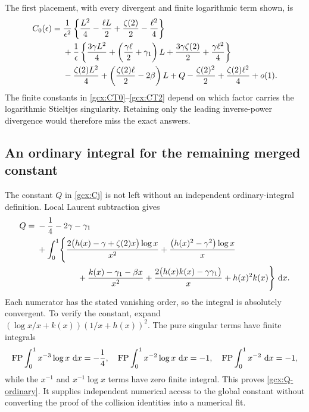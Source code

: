 The first placement, with every divergent and finite logarithmic term
shown, is
\begin{align}
 C_0(\epsilon)={}&\frac1{\epsilon^2}
  \left\{\frac{L^2}{4}-\frac{\ell L}{2}
                  +\frac{\zeta(2)}2-\frac{\ell^2}{4}\right\}\notag\\
 &+\frac1\epsilon\left\{
       \frac{3\gamma L^2}{4}
       +\left(\frac{\gamma\ell}{2}+\gamma_1\right)L
       +\frac{3\gamma\zeta(2)}2+\frac{\gamma\ell^2}{4}\right\}\notag\\
 &-\frac{\zeta(2)L^2}{4}
       +\left(\frac{\zeta(2)\ell}{2}-2\beta\right)L
       +Q-\frac{\zeta(2)^2}{2}
                +\frac{\zeta(2)\ell^2}{4}+o(1).
 \label{gcx:C0-expansion}
\end{align}
The finite constants in \eqref{gcx:CT0}--\eqref{gcx:CT2} depend on which
factor carries the logarithmic Stieltjes singularity.  Retaining only
the leading inverse-power divergence would therefore miss the exact
answers.

\subsection{An ordinary integral for the remaining merged constant}

The constant $Q$ in \eqref{gcx:Cj} is not left without an independent
ordinary-integral definition.  Local Laurent subtraction gives
\begin{align}
 Q={}&-\frac14-2\gamma-\gamma_1\notag\\
 &+\int_0^1\Biggl\{
 \frac{2\bigl(h(x)-\gamma+\zeta(2)x\bigr)\log x}{x^2}
 +\frac{\bigl(h(x)^2-\gamma^2\bigr)\log x}{x}\notag\\
 &\hspace{17mm}+\frac{k(x)-\gamma_1-\beta x}{x^2}
 +\frac{2\bigl(h(x)k(x)-\gamma\gamma_1\bigr)}x
 +h(x)^2k(x)\Biggr\}\,\dd x.
 \label{gcx:Q-ordinary}
\end{align}
Each numerator has the stated vanishing order, so the integral is
absolutely convergent.  To verify the constant, expand
$(\log x/x+k(x))(1/x+h(x))^2$.  The pure singular terms have finite
integrals
\[
 \operatorname{FP}\int_0^1x^{-3}\log x\,\,\mathrm d x=-\frac14,\quad
 \operatorname{FP}\int_0^1x^{-2}\log x\,\,\mathrm d x=-1,\quad
 \operatorname{FP}\int_0^1x^{-2}\,\,\mathrm d x=-1,
\]
while the $x^{-1}$ and $x^{-1}\log x$ terms have zero finite integral.
This proves \eqref{gcx:Q-ordinary}.  It supplies independent numerical
access to the global constant without converting the proof of the
collision identities into a numerical fit.
